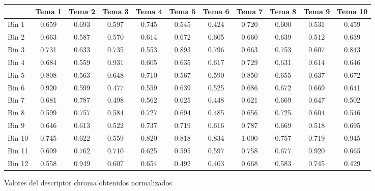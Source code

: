 \documentclass[]{article}
\makeatletter
\newcommand{\tabla}[4]{
\begin{tablehere}
\begin{center}
\begin{tabular}{#1}
#2
\end{tabular}
\caption{#3}
\label{#4}
\end{center}
\end{tablehere}
}
\newenvironment{tablehere}    %
  {\def\@captype{table}}    %

  {}              %
\makeatother
\begin{document}
\tabla
{|l|c|c|c|c|c|c|c|c|c|c|}
{
\hline
&Tema 1 & Tema 2 & Tema 3 & Tema 4 & Tema 5 & Tema 6 & Tema 7 & Tema 8 & Tema 9 & Tema 10 \\
\hline
Bin 1  & 0.659 & 0.693 & 0.597 & 0.745 & 0.545 & 0.424 & 0.720 & 0.600 & 0.531 & 0.459 \\
\hline
Bin 2  & 0.663 & 0.587 & 0.570 & 0.614 & 0.672 & 0.605 & 0.660 & 0.639 & 0.512 & 0.639 \\
\hline
Bin 3  & 0.731 & 0.633 & 0.735 & 0.553 & 0.893 & 0.796 & 0.663 & 0.753 & 0.607 & 0.843 \\
\hline
Bin 4  & 0.684 & 0.559 & 0.931 & 0.605 & 0.635 & 0.617 & 0.729 & 0.631 & 0.614 & 0.646 \\
\hline
Bin 5  & 0.808 & 0.563 & 0.648 & 0.710 & 0.567 & 0.590 & 0.850 & 0.655 & 0.637 & 0.672 \\
\hline
Bin 6  & 0.920 & 0.599 & 0.477 & 0.559 & 0.639 & 0.525 & 0.686 & 0.672 & 0.669 & 0.641 \\
\hline
Bin 7  & 0.681 & 0.787 & 0.498 & 0.562 & 0.625 & 0.448 & 0.621 & 0.669 & 0.647 & 0.502 \\
\hline
Bin 8  & 0.599 & 0.757 & 0.584 & 0.727 & 0.694 & 0.485 & 0.656 & 0.725 & 0.604 & 0.546 \\
\hline
Bin 9  & 0.646 & 0.613 & 0.522 & 0.737 & 0.719 & 0.616 & 0.787 & 0.669 & 0.518 & 0.695 \\
\hline
Bin 10 & 0.745 & 0.622 & 0.559 & 0.820 & 0.818 & 0.834 & 1.000 & 0.757 & 0.719 & 0.945 \\
\hline
Bin 11 & 0.609 & 0.762 & 0.710 & 0.625 & 0.595 & 0.597 & 0.758 & 0.677 & 0.920 & 0.665 \\
\hline
Bin 12 & 0.558 & 0.949 & 0.607 & 0.654 & 0.492 & 0.403 & 0.668 & 0.583 & 0.745 & 0.429 \\
\hline
}
{Valores del descriptor chroma obtenidos normalizados}
{tab: chroma norm}
\end{document}
